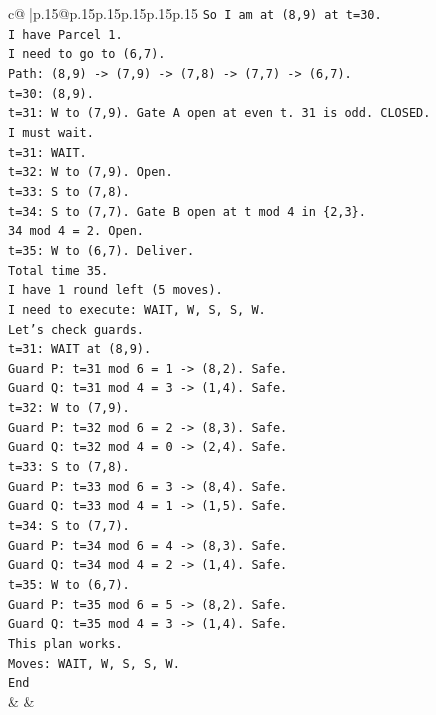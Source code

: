 \documentclass{article}
\begin{document}
{\begin{supertabular}{c@{$\;$}|p{.15\linewidth}@{}p{.15\linewidth}p{.15\linewidth}p{.15\linewidth}p{.15\linewidth}p{.15\linewidth}}
{{{\texttt{So I am at (8,9) at t=30.} \\
\texttt{I have Parcel 1.} \\
\texttt{I need to go to (6,7).} \\
\texttt{Path: (8,9) {-}> (7,9) {-}> (7,8) {-}> (7,7) {-}> (6,7).} \\
\texttt{t=30: (8,9).} \\
\texttt{t=31: W to (7,9). Gate A open at even t. 31 is odd. CLOSED.} \\
\texttt{I must wait.} \\
\texttt{t=31: WAIT.} \\
\texttt{t=32: W to (7,9). Open.} \\
\texttt{t=33: S to (7,8).} \\
\texttt{t=34: S to (7,7). Gate B open at t mod 4 in \{2,3\}.} \\
\texttt{34 mod 4 = 2. Open.} \\
\texttt{t=35: W to (6,7). Deliver.} \\
\texttt{Total time 35.} \\
\texttt{I have 1 round left (5 moves).} \\
\texttt{I need to execute: WAIT, W, S, S, W.} \\
\texttt{Let's check guards.} \\
\texttt{t=31: WAIT at (8,9).} \\
\texttt{Guard P: t=31 mod 6 = 1 {-}> (8,2). Safe.} \\
\texttt{Guard Q: t=31 mod 4 = 3 {-}> (1,4). Safe.} \\
\texttt{t=32: W to (7,9).} \\
\texttt{Guard P: t=32 mod 6 = 2 {-}> (8,3). Safe.} \\
\texttt{Guard Q: t=32 mod 4 = 0 {-}> (2,4). Safe.} \\
\texttt{t=33: S to (7,8).} \\
\texttt{Guard P: t=33 mod 6 = 3 {-}> (8,4). Safe.} \\
\texttt{Guard Q: t=33 mod 4 = 1 {-}> (1,5). Safe.} \\
\texttt{t=34: S to (7,7).} \\
\texttt{Guard P: t=34 mod 6 = 4 {-}> (8,3). Safe.} \\
\texttt{Guard Q: t=34 mod 4 = 2 {-}> (1,4). Safe.} \\
\texttt{t=35: W to (6,7).} \\
\texttt{Guard P: t=35 mod 6 = 5 {-}> (8,2). Safe.} \\
\texttt{Guard Q: t=35 mod 4 = 3 {-}> (1,4). Safe.} \\
\texttt{This plan works.} \\
\texttt{Moves: WAIT, W, S, S, W.} \\
\texttt{End} \\
            }
        }
    }
    & & \\ \\


\end{supertabular}}
\end{document}
